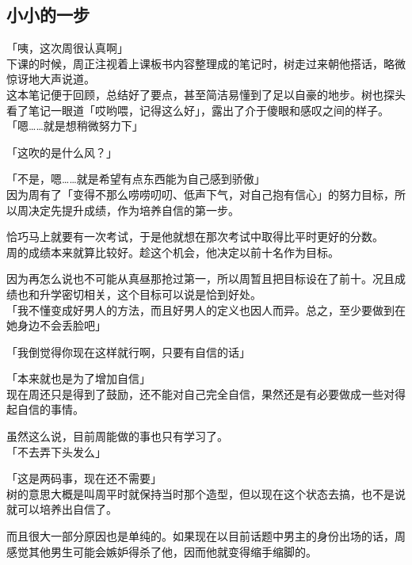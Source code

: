 \subsection{小小的一步}

「咦，这次周很认真啊」\\

下课的时候，周正注视着上课板书内容整理成的笔记时，树走过来朝他搭话，略微惊讶地大声说道。\\

这本笔记便于回顾，总结好了要点，甚至简洁易懂到了足以自豪的地步。树也探头看了笔记一眼道「哎哟喂，记得这么好」，露出了介于傻眼和感叹之间的样子。\\

「嗯……就是想稍微努力下」

「这吹的是什么风？」

「不是，嗯……就是希望有点东西能为自己感到骄傲」\\

因为周有了「变得不那么唠唠叨叨、低声下气，对自己抱有信心」的努力目标，所以周决定先提升成绩，作为培养自信的第一步。

恰巧马上就要有一次考试，于是他就想在那次考试中取得比平时更好的分数。\\

周的成绩本来就算比较好。趁这个机会，他决定以前十名作为目标。

因为再怎么说也不可能从真昼那抢过第一，所以周暂且把目标设在了前十。况且成绩也和升学密切相关，这个目标可以说是恰到好处。\\

「我不懂变成好男人的方法，而且好男人的定义也因人而异。总之，至少要做到在她身边不会丢脸吧」

「我倒觉得你现在这样就行啊，只要有自信的话」

「本来就也是为了增加自信」\\

现在周还只是得到了鼓励，还不能对自己完全自信，果然还是有必要做成一些对得起自信的事情。

虽然这么说，目前周能做的事也只有学习了。\\

「不去弄下头发么」

「这是两码事，现在还不需要」\\

树的意思大概是叫周平时就保持当时那个造型，但以现在这个状态去搞，也不是说就可以培养出自信了。

而且很大一部分原因也是单纯的。如果现在以目前话题中男主的身份出场的话，周感觉其他男生可能会嫉妒得杀了他，因而他就变得缩手缩脚的。\\

